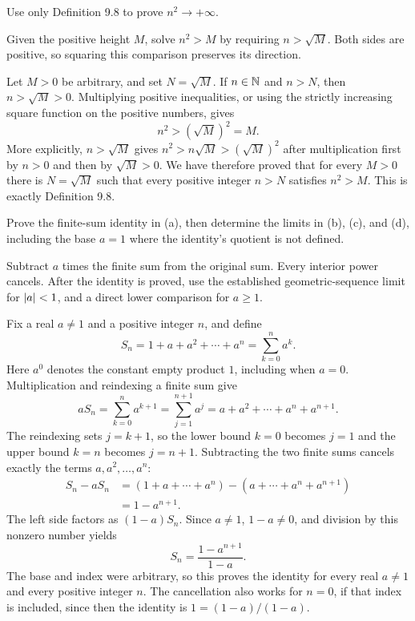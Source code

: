 

\goal Use only Definition 9.8 to prove $n^2\to+\infty$.

\idea Given the positive height $M$, solve $n^2>M$ by
requiring $n>\sqrt M$. Both sides are positive, so squaring
this comparison preserves its direction.

Let $M>0$ be arbitrary, and set $N=\sqrt M$.
If $n\in\mathbb{N}$ and $n>N$, then $n>\sqrt M>0$.
Multiplying positive inequalities, or using the strictly
increasing square function on the positive numbers, gives
\[
 n^2>(\sqrt M)^2=M.
\]
More explicitly, $n>\sqrt M$ gives
$n^2>n\sqrt M>(\sqrt M)^2$ after multiplication first
by $n>0$ and then by $\sqrt M>0$.
We have therefore proved that for every $M>0$ there is
$N=\sqrt M$ such that every positive integer $n>N$
satisfies $n^2>M$. This is exactly Definition 9.8.



\goal Prove the finite-sum identity in (a), then determine
the limits in (b), (c), and (d), including the base $a=1$
where the identity's quotient is not defined.

\idea Subtract $a$ times the finite sum from the original
sum. Every interior power cancels. After the identity is
proved, use the established geometric-sequence limit for
$\left|a\right|<1$, and a direct lower comparison for $a\geq1$.

Fix a real $a\ne1$ and a positive integer $n$, and define
\[
 S_n=1+a+a^2+\cdots+a^n=\sum_{k=0}^{n}a^k.
\]
Here $a^0$ denotes the constant empty product $1$, including
when $a=0$. Multiplication and reindexing a finite sum give
\[
 aS_n=\sum_{k=0}^{n}a^{k+1}
 =\sum_{j=1}^{n+1}a^j
 =a+a^2+\cdots+a^n+a^{n+1}.
\]
The reindexing sets $j=k+1$, so the lower bound $k=0$
becomes $j=1$ and the upper bound $k=n$ becomes $j=n+1$.
Subtracting the two finite sums cancels exactly the terms
$a,a^2,\ldots,a^n$:
\begin{align*}
 S_n-aS_n
 &=(1+a+\cdots+a^n)-(a+\cdots+a^n+a^{n+1})\\
 &=1-a^{n+1}.
\end{align*}
The left side factors as $(1-a)S_n$. Since $a\ne1$,
$1-a\ne0$, and division by this nonzero number yields
\[
 S_n=\frac{1-a^{n+1}}{1-a}.
\]
The base and index were arbitrary, so this proves the identity
for every real $a\ne1$ and every positive integer $n$.
The cancellation also works for $n=0$, if that index is
included, since then the identity is $1=(1-a)/(1-a)$.

